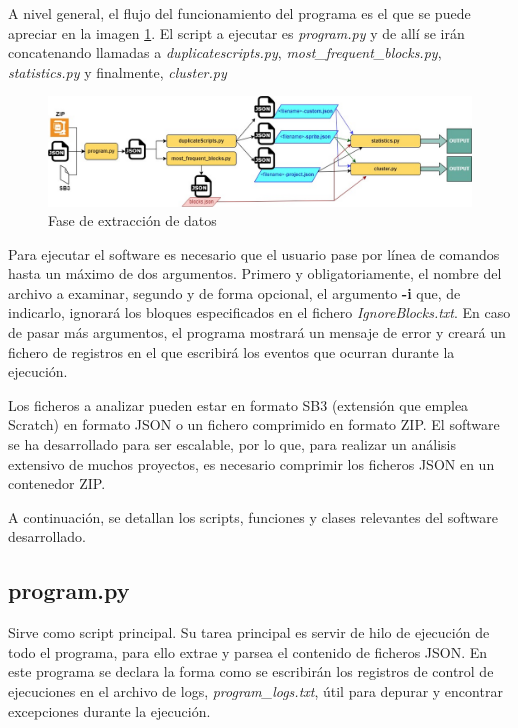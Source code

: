 \documentclass[a4paper, 12pt]{book}
\begin{document}

A nivel general, el flujo del funcionamiento del programa es el que se puede apreciar en la imagen \ref{fig:fasedesejecucion}. El script a ejecutar es \textit{program.py} y de allí se irán concatenando llamadas a \textit{duplicatescripts.py}, \textit{most\_frequent\_blocks.py}, \textit{statistics.py} y finalmente, \textit{cluster.py}

\begin{figure}[!htb]
  \centering
  \includegraphics[width=17cm, keepaspectratio]{img/flow.jpg}
  \caption{Fase de extracción de datos}
  \label{fig:fasedesejecucion}
\end{figure}

Para ejecutar el software es necesario que el usuario pase por línea de comandos hasta un máximo de dos argumentos. Primero y obligatoriamente, el nombre del archivo a examinar, segundo y de forma opcional, el argumento \textbf{-i} que, de indicarlo, ignorará los bloques especificados en el fichero \textit{IgnoreBlocks.txt}. En caso de pasar más argumentos, el programa mostrará un mensaje de error y creará un fichero de registros en el que escribirá los eventos que ocurran durante la ejecución.

Los ficheros a analizar pueden estar en formato SB3 (extensión que emplea Scratch) en formato JSON o un fichero comprimido en formato ZIP. El software se ha desarrollado para ser escalable, por lo que, para realizar un análisis extensivo de muchos proyectos, es necesario comprimir los ficheros JSON en un contenedor ZIP. 

A continuación, se detallan los scripts, funciones y clases relevantes del software desarrollado.

\subsection{program.py}

Sirve como script principal. Su tarea principal es servir de hilo de ejecución de todo el programa, para ello extrae y parsea el contenido de ficheros JSON. En este programa se declara la forma como se escribirán los registros de control de ejecuciones en el archivo de logs, \textit{program\_logs.txt}, útil para depurar y encontrar excepciones durante la ejecución.
\end{document}
